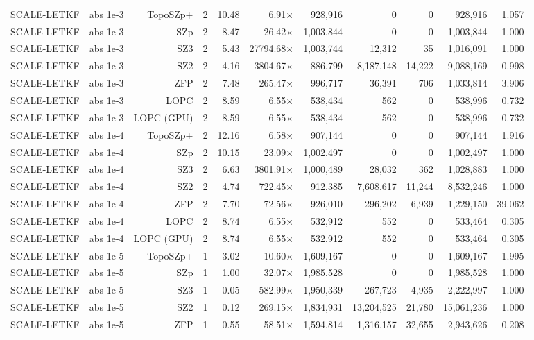 \begin{tabular}{lrrrrrrrrrr}
SCALE-LETKF & abs 1e-3 & TopoSZp+ & 2 & 10.48 & 6.91$\times$ & 928,916 & 0 & 0 & 928,916 & 1.057 \\
SCALE-LETKF & abs 1e-3 & SZp & 2 & 8.47 & 26.42$\times$ & 1,003,844 & 0 & 0 & 1,003,844 & 1.000 \\
SCALE-LETKF & abs 1e-3 & SZ3 & 2 & 5.43 & 27794.68$\times$ & 1,003,744 & 12,312 & 35 & 1,016,091 & 1.000 \\
SCALE-LETKF & abs 1e-3 & SZ2 & 2 & 4.16 & 3804.67$\times$ & 886,799 & 8,187,148 & 14,222 & 9,088,169 & 0.998 \\
SCALE-LETKF & abs 1e-3 & ZFP & 2 & 7.48 & 265.47$\times$ & 996,717 & 36,391 & 706 & 1,033,814 & 3.906 \\
SCALE-LETKF & abs 1e-3 & LOPC & 2 & 8.59 & 6.55$\times$ & 538,434 & 562 & 0 & 538,996 & 0.732 \\
SCALE-LETKF & abs 1e-3 & LOPC (GPU) & 2 & 8.59 & 6.55$\times$ & 538,434 & 562 & 0 & 538,996 & 0.732 \\
SCALE-LETKF & abs 1e-4 & TopoSZp+ & 2 & 12.16 & 6.58$\times$ & 907,144 & 0 & 0 & 907,144 & 1.916 \\
SCALE-LETKF & abs 1e-4 & SZp & 2 & 10.15 & 23.09$\times$ & 1,002,497 & 0 & 0 & 1,002,497 & 1.000 \\
SCALE-LETKF & abs 1e-4 & SZ3 & 2 & 6.63 & 3801.91$\times$ & 1,000,489 & 28,032 & 362 & 1,028,883 & 1.000 \\
SCALE-LETKF & abs 1e-4 & SZ2 & 2 & 4.74 & 722.45$\times$ & 912,385 & 7,608,617 & 11,244 & 8,532,246 & 1.000 \\
SCALE-LETKF & abs 1e-4 & ZFP & 2 & 7.70 & 72.56$\times$ & 926,010 & 296,202 & 6,939 & 1,229,150 & 39.062 \\
SCALE-LETKF & abs 1e-4 & LOPC & 2 & 8.74 & 6.55$\times$ & 532,912 & 552 & 0 & 533,464 & 0.305 \\
SCALE-LETKF & abs 1e-4 & LOPC (GPU) & 2 & 8.74 & 6.55$\times$ & 532,912 & 552 & 0 & 533,464 & 0.305 \\
SCALE-LETKF & abs 1e-5 & TopoSZp+ & 1 & 3.02 & 10.60$\times$ & 1,609,167 & 0 & 0 & 1,609,167 & 1.995 \\
SCALE-LETKF & abs 1e-5 & SZp & 1 & 1.00 & 32.07$\times$ & 1,985,528 & 0 & 0 & 1,985,528 & 1.000 \\
SCALE-LETKF & abs 1e-5 & SZ3 & 1 & 0.05 & 582.99$\times$ & 1,950,339 & 267,723 & 4,935 & 2,222,997 & 1.000 \\
SCALE-LETKF & abs 1e-5 & SZ2 & 1 & 0.12 & 269.15$\times$ & 1,834,931 & 13,204,525 & 21,780 & 15,061,236 & 1.000 \\
SCALE-LETKF & abs 1e-5 & ZFP & 1 & 0.55 & 58.51$\times$ & 1,594,814 & 1,316,157 & 32,655 & 2,943,626 & 0.208 \\

\end{tabular}
